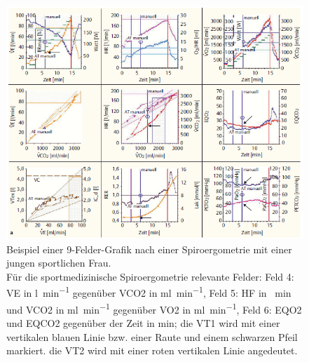 \begin{figure}[H]
	\centering
	\includegraphics[width=\textwidth]{Bilder/9fieldcomplex.png}
	\caption[Beispielhafte 9-Felder-Grafik nach einer Spiroergometrie]{Beispiel einer 9-Felder-Grafik nach einer Spiroergometrie mit einer jungen sportlichen Frau.\\
	Für die sportmedizinische Spiroergometrie relevante Felder: Feld 4: \gls{VE} in \si{\litre\per\minute} gegenüber \gls{VCO2} in \si{\milli\litre\per\minute}, Feld 5: \gls{HF} in \si{\per\minute} und \gls{VCO2} in \si{\milli\litre\per\minute} gegenüber \gls{VO2} in \si{\milli\litre\per\minute}, Feld 6: \acrshort{EQO2} und \acrshort{EQCO2} gegenüber der Zeit in \si{\minute}; die VT1 wird mit einer vertikalen blauen Linie bzw. einer Raute und einem schwarzen Pfeil markiert. die VT2 wird mit einer roten vertikalen Linie angedeutet.~\cite{Kroidl.2015}}
	\label{pic:pic2}
\end{figure}
%
